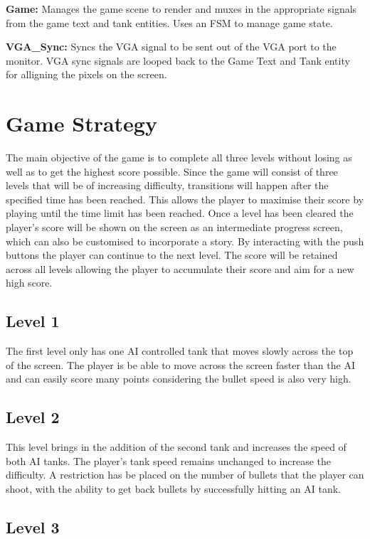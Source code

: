 \documentclass{article}
\begin{document}
\textbf{Game:} Manages the game scene to render and muxes in the appropriate signals from the game text and tank entities. Uses an FSM to manage game state.

\textbf{VGA\_Sync:} Syncs the VGA signal to be sent out of the VGA port to the monitor. VGA sync signals are looped back to the Game Text and Tank entity for alligning the pixels on the screen.

\section{Game Strategy}

The main objective of the game is to complete all three levels without losing as well as to get the highest score possible. Since the game will consist of three levels that will be of increasing difficulty, transitions will happen after the specified time has been reached. This allows the player to maximise their score by playing until the time limit has been reached. Once a level has been cleared the player's score will be shown on the screen as an intermediate progress screen, which can also be customised to incorporate a story. By interacting with the push buttons the player can continue to the next level. The score will be retained across all levels allowing the player to accumulate their score and aim for a new high score.

\subsection{Level 1}

The first level only has one AI controlled tank that moves slowly across the top of the screen. The player is be able to move across the screen faster than the AI and can easily score many points considering the bullet speed is also very high.

\subsection{Level 2}

This level brings in the addition of the second tank and increases the speed of both AI tanks. The player's tank speed remains unchanged to increase the difficulty. A restriction has be placed on the number of bullets that the player can shoot, with the ability to get back bullets by successfully hitting an AI tank.

\subsection{Level 3}
\end{document}
